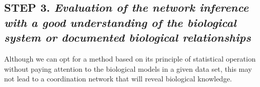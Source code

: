 \subsection*{\textbf{STEP 3. }\textit{Evaluation of the network inference with a good understanding of the biological system or documented biological relationships}} 

Although we can opt for a method based on its principle of statistical operation without paying attention to the biological models in a given data set, this may not lead to a coordination network that will reveal biological knowledge. 



 

